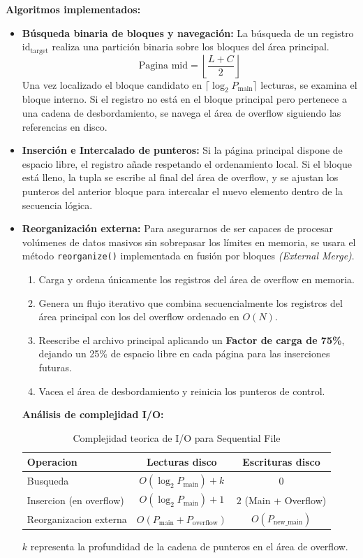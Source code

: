 \documentclass[a4paper,12pt]{article}
\begin{document}
\textbf{Algoritmos implementados:}
\begin{itemize}
    \item \textbf{Búsqueda binaria de bloques y navegación:} La búsqueda de un registro $\text{id}_{\text{target}}$ realiza una partición binaria sobre los bloques del área principal.
    \begin{equation}
        \text{Pagina mid} = \left\lfloor \frac{L+C}{2} \right\rfloor
    \end{equation}
    Una vez localizado el bloque candidato en $\lceil \log_2 P_{\text{main}} \rceil$ lecturas, se examina el bloque interno. Si el registro no está en el bloque principal pero pertenece a una cadena de desbordamiento, se navega el área de overflow siguiendo las referencias en disco.
    \item \textbf{Inserción e Intercalado de punteros:} Si la página principal dispone de espacio libre, el registro añade respetando el ordenamiento local. Si el bloque está lleno, la tupla se escribe al final del área de overflow, y se ajustan los punteros del anterior bloque para intercalar el nuevo elemento dentro de la secuencia lógica.
    \item \textbf{Reorganización externa:} Para asegurarnos de ser capaces de procesar volúmenes de datos masivos sin sobrepasar los límites en memoria, se usara el método \texttt{reorganize()} implementada en fusión por bloques \textit{(External Merge)}.
    \begin{enumerate}
        \item Carga y ordena únicamente los registros del área de overflow en memoria.
        \item Genera un flujo iterativo que combina secuencialmente los registros del área principal con los del overflow ordenado en $O(N)$.
        \item Reescribe el archivo principal aplicando un \textbf{Factor de carga de 75\%}, dejando un 25\% de espacio libre en cada página para las inserciones futuras.
        \item Vacea el área de desbordamiento y reinicia los punteros de control.
    \end{enumerate}


\textbf{Análisis de complejidad I/O:}
\begin{table}[h]
\centering
\caption{Complejidad teorica de I/O para Sequential File}
\label{tab:seq_complejidad}
\begin{tabular}{|l|c|c|}
\hline
\textbf{Operacion} & \textbf{Lecturas disco} & \textbf{Escrituras disco} \\ \hline
Busqueda & $O(\log_2 P_{\text{main}}) + k$ & $0$ \\ \hline
Insercion (en overflow) & $O(\log_2 P_{\text{main}}) + 1$ & $2$ (Main + Overflow) \\ \hline
Reorganizacion externa & $O(P_{\text{main}} + P_{\text{overflow}})$ & $O(P_{\text{new\_main}})$ \\ \hline
\end{tabular}
\end{table}


$k$ representa la profundidad de la cadena de punteros en el área de overflow.
\end{itemize}
\end{document}

